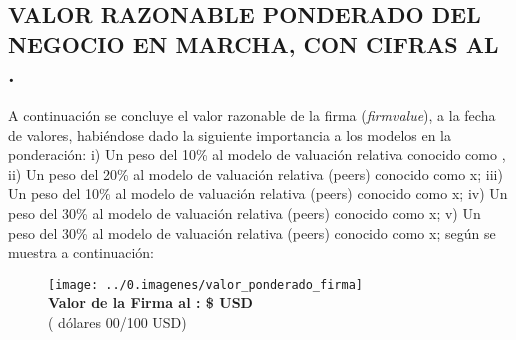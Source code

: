 
\newcommand{\ponda}{\peersa}
\newcommand{\pondaPorcentage}{10}
\newcommand{\pondb}{\peersb}
\newcommand{\pondbPorcentage}{20}
\newcommand{\pondc}{\peersc}
\newcommand{\pondcPorcentage}{10}
\newcommand{\pondd}{\peersd}
\newcommand{\ponddPorcentage}{30}
\newcommand{\ponde}{\peersd}
\newcommand{\pondePorcentage}{30}

\subsection{VALOR RAZONABLE PONDERADO DEL NEGOCIO EN MARCHA, CON CIFRAS AL \fechaValoresCorto.}

A continuaci\'on se concluye el valor razonable de la firma (\textit{\gls{firmvalue}}), a la fecha de valores, habi\'endose dado la siguiente importancia a los modelos en la ponderaci\'on: i) Un peso del \pondaPorcentage\% al modelo de valuaci\'on relativa conocido como \ponda{}, ii) Un peso del \pondbPorcentage\%  al modelo de valuaci\'on relativa (\gls{peers}) conocido como \pondb{} x; iii) Un peso del \pondcPorcentage\%  al modelo de valuaci\'on relativa (\gls{peers}) conocido como \pondc{} x; iv) Un peso del \ponddPorcentage\%  al modelo de valuaci\'on relativa (\gls{peers}) conocido como \pondd{} x;  v) Un peso del \pondePorcentage\%  al modelo de valuaci\'on relativa (\gls{peers}) conocido como \ponde{} x; seg\'un se muestra a continuaci\'on:

\begin{figure}[H]
\centering
\texttt{[image: ../0.imagenes/valor\_ponderado\_firma]}\\

\textbf{\textcolor{principal}{Valor de la Firma al  \fechaValoresCorto:} \$\valorFirma{} USD}\\
(\textcolor{principal}{\valorFirmaLetra{} d\'olares 00/100 USD})
\end{figure}
